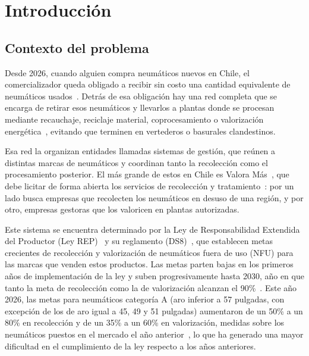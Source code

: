 \documentclass[letterpaper]{article}
\begin{document}
\thispagestyle{empty}
\renewcommand{\contentsname}{Índice}
\tableofcontents


\newpage
{}
\section{Introducción}

\subsection*{Contexto del problema}

Desde 2026, cuando alguien compra neumáticos nuevos en Chile, el comercializador queda obligado a recibir sin costo una cantidad equivalente de neumáticos usados~\cite{DS8}. Detrás de esa obligación hay una red completa que se encarga de retirar esos neumáticos y llevarlos a plantas donde se procesan mediante recauchaje, reciclaje material, coprocesamiento o valorización energética~\cite{DS8}, evitando que terminen en vertederos o basurales clandestinos.

Esa red la organizan entidades llamadas sistemas de gestión, que reúnen a distintas marcas de neumáticos y coordinan tanto la recolección como el procesamiento posterior. El más grande de estos en Chile es Valora Más~\cite{paiscircular2026}, que debe licitar de forma abierta los servicios de recolección y tratamiento~\cite{DS8}: por un lado busca empresas que recolecten los neumáticos en desuso de una región, y por otro, empresas gestoras que los valoricen en plantas autorizadas.

Este sistema se encuentra determinado por la Ley de Responsabilidad Extendida del Productor (Ley REP)~\cite{leyrep20920} y su reglamento (DS8)~\cite{DS8}, que establecen metas crecientes de recolección y valorización de neumáticos fuera de uso (NFU) para las marcas que venden estos productos. Las metas parten bajas en los primeros años de implementación de la ley y suben progresivamente hasta 2030, año en que tanto la meta de recolección como la de valorización alcanzan el 90\%~\cite{DS8,induambiente2021}. Este año 2026, las metas para neumáticos categoría A (aro inferior a 57 pulgadas, con excepción de los de aro igual a 45, 49 y 51 pulgadas) aumentaron de un 50\% a un 80\% en recolección y de un 35\% a un 60\% en valorización, medidas sobre los neumáticos puestos en el mercado el año anterior~\cite{DS8,paiscircular2026}, lo que ha generado una mayor dificultad en el cumplimiento de la ley respecto a los años anteriores.
\end{document}
